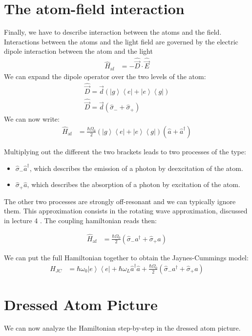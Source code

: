 \documentclass[10pt]{article}
\let\cite\citep
\providecommand\citep{\cite}
\newcommand{\bra}[1]{\ensuremath{\left\langle#1\right|}}
\newcommand{\ket}[1]{\ensuremath{\left|#1\right\rangle}}
\begin{document}
\section{The atom-field interaction}
Finally, we have to describe interaction between the atoms and the field. 
%
Interactions between the atoms and the light field are governed by the electric dipole interaction between the atom and the light
\begin{align}
\hat{H}_\textrm{af}&= -\hat{\vec{D}} \cdot \hat{\vec{E}}
\end{align}
We can expand the dipole operator over the two levels of the atom:
\begin{align}
\hat{\vec{D}} = \vec{d}\left(\ket{g}\bra{e}+\ket{e}\bra{g}\right)\\
\hat{\vec{D}} = \vec{d}\left(\hat{\sigma}_- + \hat{\sigma}_+\right)
\end{align}
We can now write:
\begin{align}
\hat{H}_\textrm{af}&= \frac{\hbar \Omega_0}{2} \left(\ket{g}\bra{e}+\ket{e}\bra{g}\right)\left(\hat{a}+\hat{a}^\dag\right)
\end{align}

Multiplying out the different the two brackets leads to two processes of the type:
\begin{itemize}
\item $\hat{\sigma}_- \hat{a}^\dag$, which describes the emission of a photon by deexcitation of the atom.
\item  $\hat{\sigma}_+ \hat{a}$, which describes the absorption of a photon by excitation of the atom.
\end{itemize}
The other two processes are strongly off-resonant and we can typically ignore them. This approximation consists in the rotating wave approximation, discussed in lecture 4 \cite{Jendrzejewski}. The coupling hamiltonian reads then:

\begin{align}
\hat{H}_\textrm{af}&= \frac{\hbar \Omega_0}{2} \left(\hat{\sigma}_- a^\dag +\hat{\sigma}_+ a\right)
\end{align}

We can put the full Hamiltonian together to obtain the Jaynes-Cummings model:
\begin{align}
H_{JC}&=\hbar\omega_0 \ket{e}\bra{e} +\hbar\omega_L \hat{a}^\dag \hat{a} +\frac{\hbar \Omega_0}{2} \left(\hat{\sigma}_- a^\dag +\hat{\sigma}_+ a\right)
\end{align}


\section{Dressed Atom Picture}
We can now analyze the Hamiltonian step-by-step in the dressed atom picture.
\end{document}
